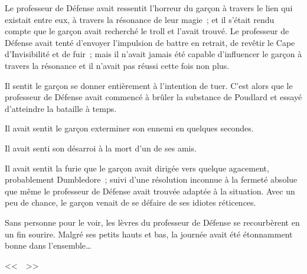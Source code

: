 Le professeur de Défense avait ressentit l'horreur du garçon à travers le lien qui existait entre eux, à travers la résonance de leur magie~; et il s'était rendu compte que le garçon avait recherché le troll et l'avait trouvé. Le professeur de Défense avait tenté d'envoyer l'impulsion de battre en retrait, de revêtir le Cape d'Invisibilité et de fuir~; mais il n'avait jamais été capable d'influencer le garçon à travers la résonance et il n'avait pas réussi cette fois non plus.

Il sentit le garçon se donner entièrement à l'intention de tuer. C'est alors que le professeur de Défense avait commencé à brûler la substance de Poudlard et essayé d'atteindre la bataille à temps.

Il avait sentit le garçon exterminer son ennemi en quelques secondes.

Il avait senti son désarroi à la mort d'un de ses amis.

Il avait sentit la furie que le garçon avait dirigée vers quelque agacement, probablement Dumbledore~; suivi d'une résolution inconnue à la fermeté absolue que même le professeur de Défense avait trouvée adaptée à la situation. Avec un peu de chance, le garçon venait de se défaire de ses idiotes réticences.

Sans personne pour le voir, les lèvres du professeur de Défense se recourbèrent en un fin sourire. Malgré ses petits hauts et bas, la journée avait été étonnamment bonne dans l'ensemble…

<<~~>>
